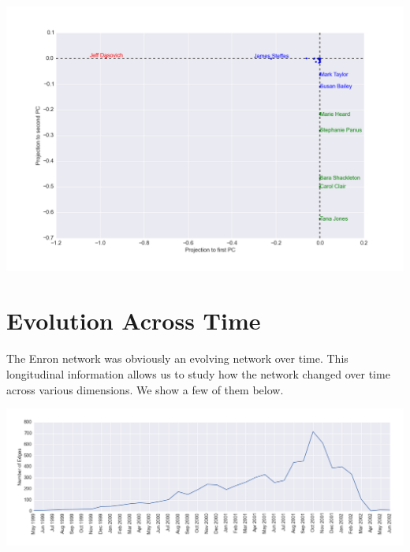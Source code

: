 \documentclass[12pt]{article}
\begin{document}
\includegraphics[width=1\textwidth]{ProjectionPC}




\section{Evolution Across Time} The Enron network was obviously an evolving network over time. This longitudinal information allows us to study how the network changed over time across various dimensions. We show a few of them below.


\includegraphics[width=1\textwidth]{Timeseries_Edges}
\end{document}
